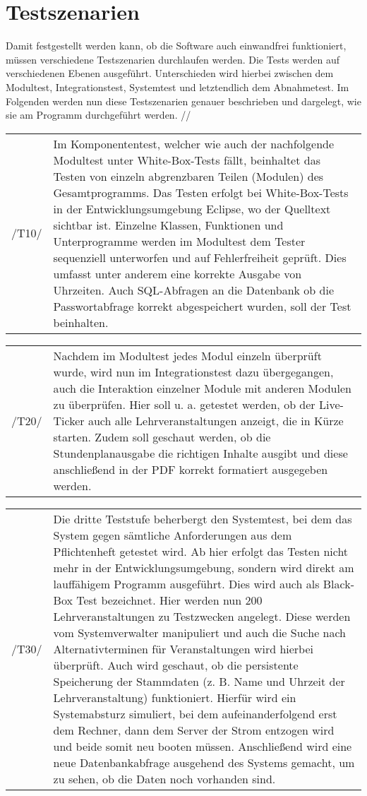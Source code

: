 \section{Testszenarien}
\label{sec:Testszenarien}


Damit festgestellt werden kann, ob die Software auch einwandfrei funktioniert, müssen verschiedene Testszenarien durchlaufen werden.
Die Tests werden auf verschiedenen Ebenen ausgeführt. Unterschieden wird hierbei zwischen dem Modultest, Integrationstest, Systemtest und letztendlich dem Abnahmetest.
Im Folgenden werden nun diese Testszenarien genauer beschrieben und dargelegt, wie sie am 
Programm durchgeführt werden.
//
\begin{tabular}{p{1.5cm}p{14.5cm}}
 /T10/	& Im Komponententest, welcher wie auch der nachfolgende Modultest unter White-Box-Tests fällt, beinhaltet das Testen von einzeln abgrenzbaren Teilen (Modulen) des Gesamtprogramms. Das Testen erfolgt bei White-Box-Tests in der Entwicklungsumgebung Eclipse, wo der Quelltext sichtbar ist. Einzelne Klassen, Funktionen und Unterprogramme werden im Modultest dem Tester sequenziell unterworfen und auf Fehlerfreiheit geprüft. Dies umfasst unter anderem eine korrekte Ausgabe von Uhrzeiten. Auch SQL-Abfragen an die Datenbank ob die Passwortabfrage korrekt abgespeichert wurden, soll der Test beinhalten. \\[0.25cm]	 
\end{tabular}

\begin{tabular}{p{1.5cm}p{14.5cm}}
 /T20/	& Nachdem im Modultest jedes Modul einzeln überprüft wurde, wird nun im Integrationstest dazu übergegangen, auch die Interaktion einzelner Module mit anderen Modulen zu überprüfen.
Hier soll u. a. getestet werden, ob der Live-Ticker auch alle Lehrveranstaltungen anzeigt, die in Kürze starten. Zudem soll geschaut werden, ob die Stundenplanausgabe die richtigen Inhalte ausgibt und diese anschließend in der PDF korrekt formatiert ausgegeben werden. \\[0.25cm]	 
\end{tabular}

\begin{tabular}{p{1.5cm}p{14.5cm}}
 /T30/	& Die dritte Teststufe beherbergt den Systemtest, bei dem das System gegen sämtliche Anforderungen aus dem Pflichtenheft getestet wird. Ab hier erfolgt das Testen nicht mehr in der Entwicklungsumgebung, sondern wird direkt am lauffähigem Programm ausgeführt. Dies wird auch als Black-Box Test bezeichnet.
Hier werden nun 200 Lehrveranstaltungen zu Testzwecken angelegt. Diese werden vom Systemverwalter manipuliert und auch die Suche nach Alternativterminen für Veranstaltungen wird hierbei überprüft. Auch wird geschaut, ob die persistente Speicherung der Stammdaten
(z. B. Name und Uhrzeit der Lehrveranstaltung) funktioniert. Hierfür wird ein Systemabsturz simuliert, bei dem aufeinanderfolgend erst dem Rechner, dann dem Server der Strom entzogen wird und beide somit neu booten müssen. Anschließend wird eine neue Datenbankabfrage ausgehend des Systems gemacht, um zu sehen, ob die Daten noch vorhanden sind. \\[0.25cm]	 
\end{tabular}

